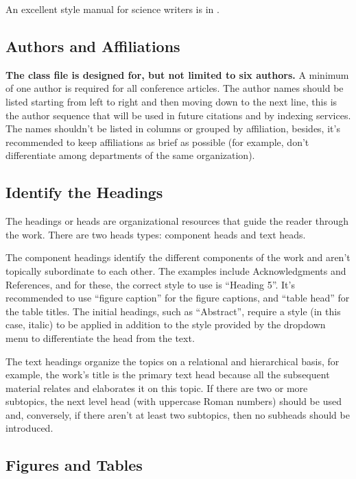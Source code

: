 \documentclass[letterpaper, 10pt, conference]{IEEEtran} %
\begin{document}
	An excellent style manual for science writers is in \cite{bibliographicReference3}.
	
	\subsection{Authors and Affiliations} \label{subsectionAuthorsAndAffiliations}
	\textbf{The class file is designed for, but not limited to six authors.} A  minimum of one author is required for all conference articles. The author names should be listed starting from left to right and then moving down to the next line, this is the author sequence that will be used in future citations and by indexing services. The names shouldn't be listed in columns or grouped by affiliation, besides, it's recommended to keep affiliations as brief as possible (for example, don't differentiate among departments of the same organization).
	
	\subsection{Identify the Headings} \label{subsectionIdentifyTheHeadings}
	The headings or heads are organizational resources that guide the reader through the work. There are two heads types: component heads and text heads.
	
	The component headings identify the different components of the work and aren't topically subordinate to each other. The examples include Acknowledgments and References, and for these, the correct style to use is ``Heading 5''. It's recommended to use ``figure caption'' for the figure captions, and ``table head'' for the table titles. The initial headings, such as ``Abstract'', require a style (in this case, italic) to be applied  in addition to the style provided by the dropdown menu to differentiate the head from the text.
	
	The text headings organize the topics on a relational and hierarchical basis, for example, the work's title is the primary text head because all the subsequent material relates and elaborates it on this topic. If there are two or more subtopics, the next level head (with uppercase Roman numbers) should be used and, conversely, if there aren't at least two subtopics, then no subheads should be introduced.
	
	\subsection{Figures and Tables} \label{subsectionFiguresAndTables}
\end{document}
